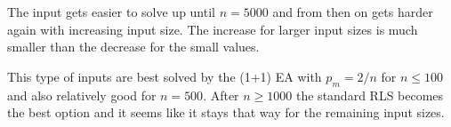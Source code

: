 

The input gets easier to solve up until $n=5000$ and from then on gets harder again with increasing input size.
The increase for larger input sizes is much smaller than the decrease for the small values.



This type of inputs are best solved by the (1+1) EA with $p_m=2/n$ for $n\le100$ and also relatively good for $n=500$.
After $n\ge1000$ the standard RLS becomes the best option and it seems like it stays that way for the remaining input sizes.
